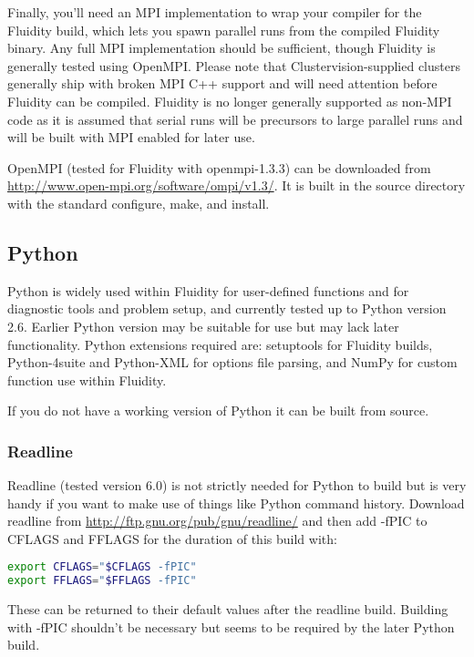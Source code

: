 Finally, you'll need an MPI implementation to wrap your compiler for the
Fluidity build, which lets you spawn parallel runs from the compiled Fluidity
binary. Any full MPI implementation should be sufficient, though Fluidity is
generally tested using OpenMPI. Please note that Clustervision-supplied
clusters generally ship with broken MPI C++ support and will need attention
before Fluidity can be compiled. Fluidity is no longer generally supported as
non-MPI code as it is assumed that serial runs will be precursors to large
parallel runs and will be built with MPI enabled for later use.

OpenMPI (tested for Fluidity with openmpi-1.3.3) can be downloaded from
\url{http://www.open-mpi.org/software/ompi/v1.3/}. It is built in the source
directory with the standard configure, make, and install.

\subsection{Python}
\label{sec:required_libraries_python}

Python is widely used within Fluidity for user-defined functions and for
diagnostic tools and problem setup, and currently tested up to Python version
2.6. Earlier Python version may be suitable for use but may lack later
functionality. Python extensions required are: setuptools for Fluidity builds,
Python-4suite and Python-XML for options file parsing, and NumPy for custom
function use within Fluidity.

If you do not have a working version of Python it can be built from source. 

\subsubsection{Readline}
\label{sec:required_libraries_python_readline}

Readline (tested version 6.0) is not strictly needed for Python to build but is
very handy if you want to make use of things like Python command history.
Download readline from \url{http://ftp.gnu.org/pub/gnu/readline/} and then add
-fPIC to CFLAGS and FFLAGS for the duration of this build with:

\begin{lstlisting}[language=bash]
export CFLAGS="$CFLAGS -fPIC"
export FFLAGS="$FFLAGS -fPIC"
\end{lstlisting}

These can be returned to their default values after the readline build.
Building with -fPIC shouldn't be necessary but seems to be required by the
later Python build.

